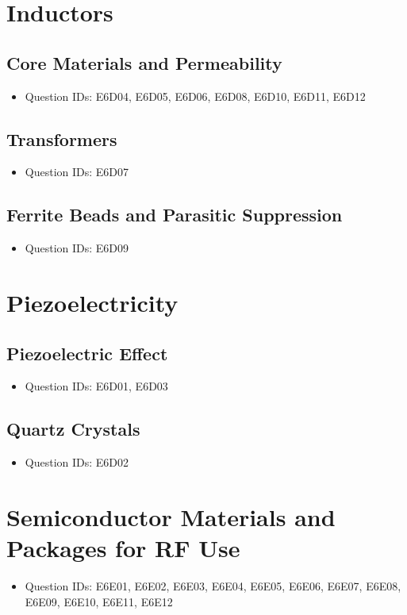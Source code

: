 \documentclass{book}
\begin{document}
\section{Inductors}
\subsection{Core Materials and Permeability}
\begin{itemize}
    \item Question IDs: E6D04, E6D05, E6D06, E6D08, E6D10, E6D11, E6D12
\end{itemize}
\subsection{Transformers}
\begin{itemize}
    \item Question IDs: E6D07
\end{itemize}
\subsection{Ferrite Beads and Parasitic Suppression}
\begin{itemize}
    \item Question IDs: E6D09
\end{itemize}

\section{Piezoelectricity}
\subsection{Piezoelectric Effect}
\begin{itemize}
    \item Question IDs: E6D01, E6D03
\end{itemize}
\subsection{Quartz Crystals}
\begin{itemize}
    \item Question IDs: E6D02
\end{itemize}

\section{Semiconductor Materials and Packages for RF Use}
\begin{itemize}
    \item Question IDs: E6E01, E6E02, E6E03, E6E04, E6E05, E6E06, E6E07, E6E08, E6E09, E6E10, E6E11, E6E12
\end{itemize}
\end{document}
